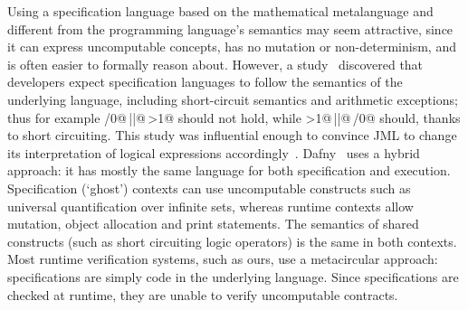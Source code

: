 


Using a specification language based on the mathematical metalanguage and different from the programming language's semantics may seem attractive, since it can express uncomputable concepts, has no mutation or non-determinism, and is often easier to formally reason about.
However, a study~\cite{chalin2007logical} discovered that developers expect specification languages to follow the semantics of the underlying language, including short-circuit semantics and arithmetic exceptions; thus for example /0@\,\Q@||@\,>1@ should not hold, while >1@\,\Q@||@\,/0@ should, thanks to short circuiting.
This study was influential enough to convince JML to change its interpretation of logical expressions
accordingly~\cite{chalin2008jml}.
Dafny~\cite{DBLP:conf/sigada/Leino12} uses a hybrid approach: it has mostly the same language for both specification and execution. Specification (`ghost') contexts can use uncomputable constructs such as universal quantification over infinite sets, whereas runtime contexts allow mutation, object allocation and print statements. The semantics of shared constructs (such as short circuiting logic operators) is the same in both contexts.
Most runtime verification systems, such as ours, use a metacircular approach: specifications are simply code in the underlying language. Since specifications are checked at runtime, they are unable to verify uncomputable contracts.

